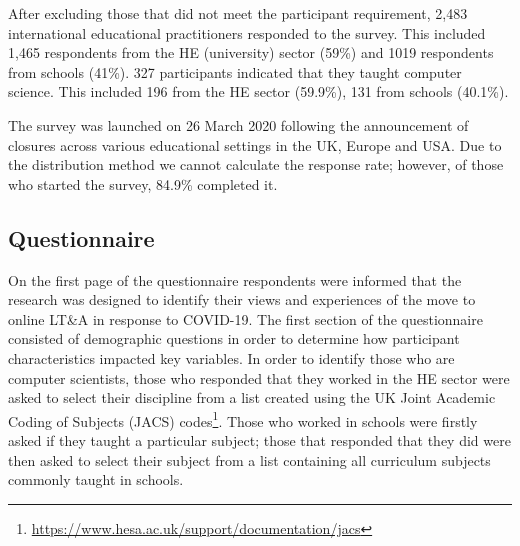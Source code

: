 \documentclass[sigconf]{acmart}
\begin{document}
After excluding those that did not meet the participant requirement,
2,483 international educational practitioners responded to the
survey. This included 1,465 respondents from the HE (university)
sector (59\%) and 1019 respondents from schools (41\%). 327
participants indicated that they taught computer science. This
included 196 from the HE sector (59.9\%), 131 from schools (40.1\%).


The survey was launched on 26 March 2020 following the announcement of
closures across various educational settings in the UK, Europe and USA. Due to the
distribution method we cannot calculate the response rate; however, of
those who started the survey, 84.9\% completed it.

\subsection{Questionnaire}


On the first page of the questionnaire respondents were informed that
the research was designed to identify their views and experiences of
the move to online LT\&A in response to COVID-19. The first section of
the questionnaire consisted of demographic questions in order to
determine how participant characteristics impacted key variables. In
order to identify those who are computer scientists, those who
responded that they worked in the HE sector were asked to select their
discipline from a list created using the UK Joint Academic Coding of
Subjects (JACS)
codes\footnote{\url{https://www.hesa.ac.uk/support/documentation/jacs}}. Those
who worked in schools were firstly asked if they taught a particular
subject; those that responded that they did were then asked to select
their subject from a list containing all curriculum subjects commonly
taught in schools.
\end{document}
